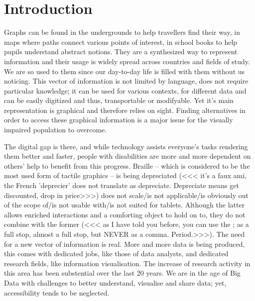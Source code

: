 \chapter{Introduction}

Graphs can be found in the undergrounds to help travellers find their way, in maps where paths connect various points of interest, in school books to help pupils understand abstract notions. They are a synthesized way to represent information and their usage is widely spread across countries and fields of study. We are so used to them since our
day-to-day life is filled with them without us noticing. This vector of information is not limited by language, does not require particular knowledge; it can be used for various contexts, for different data and can be easily digitized and thus, transportable or modifyable. Yet it's main representation is graphical and therefore relies on sight. Finding alternatives in order to access these graphical information is a major issue for the visually impaired population to overcome. 

The digital gap is there, and while technology assists everyone's tasks rendering them better and faster, people with disabilities are more and more dependent on others' help to benefit from this progress. Braille -- which is
considered to be the most used form of tactile graphics -- is being depreciated (<<< it's a faux ami, the French 'deprecier' does not translate as depreciate. Depreciate means get discounted, drop in price>>>) does not scale/is not applicable/is obviously out of the scope of/is not usable with/is not suited for tablets. Although the latter allows enriched interactions and a comforting object to hold on to, they do not combine
with the former (<<< as I have told you before, you can use the ; as a full stop, almost a full stop, but NEVER as a comma. Period.>>>). The need for a new vector of information is real. More and more data is being produced, this comes with dedicated jobs, like those of data analysts, and dedicated research fields, like information visualisation. The increase of research activity in this area has been substential over the last 20 years. We are in the age of Big Data with challenges to better understand, visualise and share data; yet, accessibility tends to be neglected.

